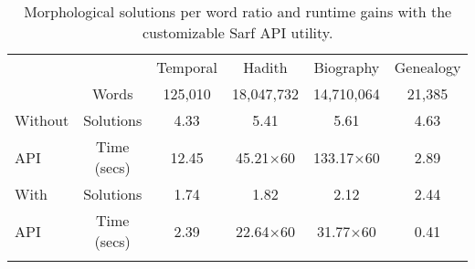 \begin{table}[tb]
\centering
  \begin{minipage}{.8\textwidth}
  \caption{\label{t:sarfapi}Morphological solutions per word ratio and runtime gains with the customizable Sarf API utility.}
    \begin{tabular}{lccccc}\toprule
              &             & Temporal & Hadith        & Biography       & Genealogy \\ \colrule

              & Words       & 125,010  & 18,047,732    & 14,710,064      & 21,385    \\[3pt]
   Without    & Solutions   & 4.33     & 5.41          & 5.61            & 4.63     \\
        API   & Time (secs) & 12.45    &45.21$\times$60& 133.17$\times$60& 2.89     \\[3pt]
      With    & Solutions   & 1.74     & 1.82          & 2.12            & 2.44      \\
      API     & Time (secs) & 2.39     &22.64$\times$60& 31.77$\times$60 & 0.41\\
    \botrule
    \end{tabular}%
    \end{minipage}
\end{table}%

